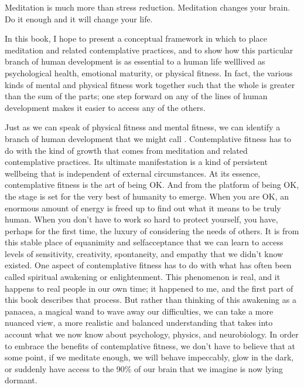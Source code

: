 \documentclass[a5paper,10pt,english]{book}
\begin{document}
\sphinxAtStartPar
Meditation is much more than stress reduction. Meditation changes your
brain. Do it enough and it will change your life.

\sphinxAtStartPar
In this book, I hope to present a conceptual framework in which to place
meditation and related contemplative practices, and to show how this
particular branch of human development is as essential to a human life
well\sphinxhyphen{}lived as psychological health, emotional maturity, or physical
fitness. In fact, the various kinds of mental and physical fitness work
together such that the whole is greater than the sum of the parts; one
step forward on any of the lines of human development makes it easier to
access any of the others.

\sphinxAtStartPar
Just as we can speak of physical fitness and mental fitness, we can
identify a branch of human development that we might call . Contemplative fitness has to do with the kind of growth that
comes from meditation and related contemplative practices. Its ultimate
manifestation is a kind of persistent well\sphinxhyphen{}being that is independent of
external circumstances. At its essence, contemplative fitness is the art
of being OK. And from the platform of being OK, the stage is set for the
very best of humanity to emerge. When you are OK, an enormous amount of
energy is freed up to find out what it means to be truly human. When you
don’t have to work so hard to protect yourself, you have, perhaps for
the first time, the luxury of considering the needs of others. It is
from this stable place of equanimity and self\sphinxhyphen{}acceptance that we can
learn to access levels of sensitivity, creativity, spontaneity, and
empathy that we didn’t know existed. One aspect of contemplative fitness
has to do with what has often been called spiritual awakening or
enlightenment. This phenomenon is real, and it happens to real people in
our own time; it happened to me, and the first part of this book
describes that process. But rather than thinking of this awakening as a
panacea, a magical wand to wave away our difficulties, we can take a
more nuanced view, a more realistic and balanced understanding that
takes into account what we now know about psychology, physics, and
neurobiology. In order to embrace the benefits of contemplative fitness,
we don’t have to believe that at some point, if we meditate enough, we
will behave impeccably, glow in the dark, or suddenly have access to the
90\% of our brain that we imagine is now lying dormant.
\end{document}
